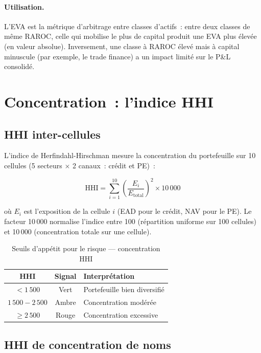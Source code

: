 \documentclass[12pt, a4paper, twoside, openright]{report}
\theoremstyle{definition}
\begin{document}
\paragraph{Utilisation.} L'EVA est la métrique d'arbitrage entre classes d'actifs~: entre deux classes de même RAROC, celle qui mobilise le plus de capital produit une EVA plus élevée (en valeur absolue). Inversement, une classe à RAROC élevé mais à capital minuscule (par exemple, le trade finance) a un impact limité sur le P\&L consolidé.

\section{Concentration~: l'indice HHI}
\label{sec:metriques:hhi}

\subsection{HHI inter-cellules}

L'indice de Herfindahl-Hirschman \citep{herfindahl1950} mesure la concentration du portefeuille sur 10 cellules (5 secteurs $\times$ 2 canaux~: crédit et PE)~:

\begin{equation}
\text{HHI} = \sum_{i=1}^{10} \left(\frac{E_i}{E_{\text{total}}}\right)^2 \times 10\,000
\label{eq:hhi}
\end{equation}

\noindent où $E_i$ est l'exposition de la cellule $i$ (EAD pour le crédit, NAV pour le PE). Le facteur 10\,000 normalise l'indice entre 100 (répartition uniforme sur 100 cellules) et 10\,000 (concentration totale sur une cellule).

\begin{table}[htbp]
\centering
\caption{Seuils d'appétit pour le risque --- concentration HHI}
\label{tab:hhi-seuils}
\begin{tabular}{ccl}
\toprule
HHI & Signal & Interprétation \\
\midrule
$< 1\,500$ & Vert & Portefeuille bien diversifié \\
$1\,500 - 2\,500$ & Ambre & Concentration modérée \\
$\geq 2\,500$ & Rouge & Concentration excessive \\
\bottomrule
\end{tabular}
\end{table}

\subsection{HHI de concentration de noms}
\end{document}
